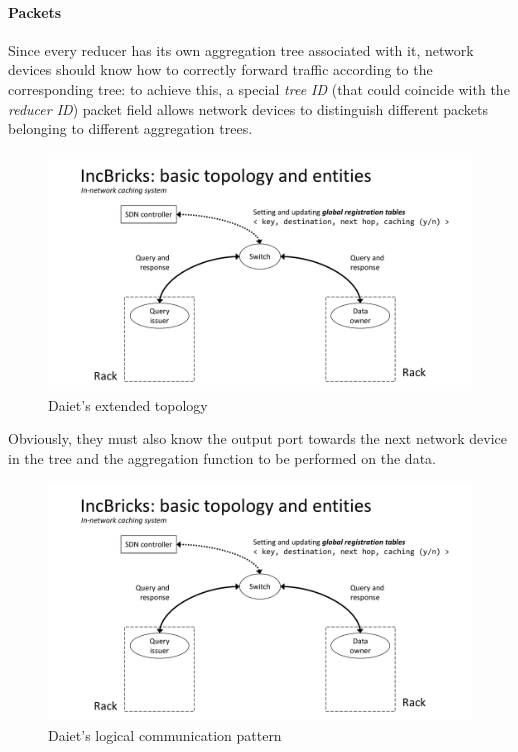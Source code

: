 \paragraph{Packets}
Since every reducer has its own aggregation tree associated with it, network devices should know how to correctly forward traffic according to the corresponding tree: to achieve this, a special \textit{tree ID} (that could coincide with the \textit{reducer ID}) packet field allows network devices to distinguish different packets belonging to different aggregation trees.

\begin{figure}[!htb]
    \centering
        \includegraphics[page=10, clip, trim=0.5cm 0.7cm 1.2cm 2.7cm, width=1.00\textwidth]{figures/analysis/inp/presentation.pdf}
    \caption{Daiet's \texorpdfstring{\cite{daiet}}{} extended topology}
\end{figure}

Obviously, they must also know the output port towards the next network device in the tree and the aggregation function to be performed on the data.

\begin{figure}[!htb]
    \centering
        \includegraphics[page=11, clip, trim=0.35cm 0.6cm 0.3cm 2.7cm, width=1.00\textwidth]{figures/analysis/inp/presentation.pdf}
    \caption{Daiet's \texorpdfstring{\cite{daiet}}{} logical communication pattern}
\end{figure}

